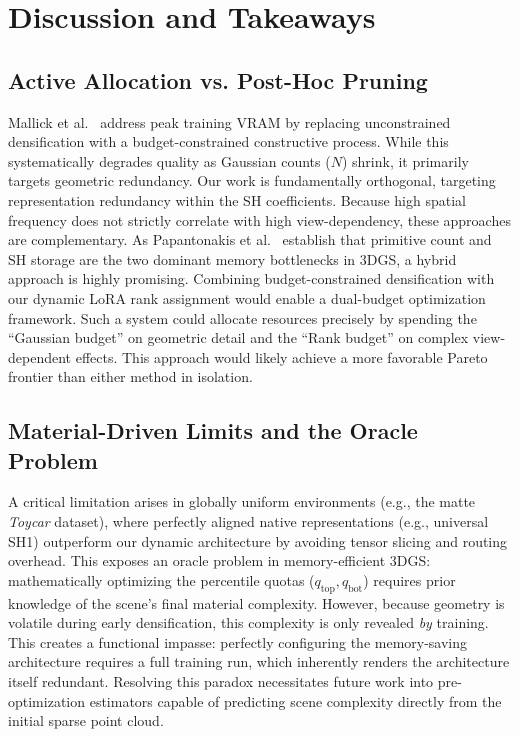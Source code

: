 \documentclass[sigconf]{acmart}
\begin{document}
\section{Discussion and Takeaways}
\label{sec:discussion}
\subsection{Active Allocation vs. Post-Hoc Pruning}
Mallick et al.~\cite{taming3dgs} address peak training VRAM by replacing 
unconstrained densification with a budget-constrained constructive process. 
While this systematically degrades quality as Gaussian counts ($N$) shrink, it 
primarily targets geometric redundancy. Our work is fundamentally orthogonal, 
targeting representation redundancy within the SH coefficients. Because high 
spatial frequency does not strictly correlate with high view-dependency, these 
approaches are complementary. As Papantonakis et al.~\cite{Papantonakis_2024} 
establish that primitive count and SH storage are the two dominant memory 
bottlenecks in 3DGS, a hybrid approach is highly promising. Combining 
budget-constrained densification with our dynamic LoRA rank assignment would 
enable a dual-budget optimization framework. Such a system could allocate 
resources precisely by spending the ``Gaussian budget'' on geometric detail 
and the ``Rank budget'' on complex view-dependent effects. This approach 
would likely achieve a more favorable Pareto frontier than either method in 
isolation.

\subsection{Material-Driven Limits and the Oracle Problem}
A critical limitation arises in globally uniform environments (e.g., the matte 
\textit{Toycar} dataset), where perfectly aligned native representations (e.g., 
universal SH1) outperform our dynamic architecture by avoiding tensor slicing 
and routing overhead. This exposes an oracle problem in memory-efficient 
3DGS: mathematically optimizing the percentile quotas ($q_{\text{top}}, 
q_{\text{bot}}$) requires prior knowledge of the scene's final material 
complexity. However, because geometry is volatile during early densification, 
this complexity is only revealed \emph{by} training. This creates a functional 
impasse: perfectly configuring the memory-saving architecture requires a full 
training run, which inherently renders the architecture itself redundant. 
Resolving this paradox necessitates future work into pre-optimization 
estimators capable of predicting scene complexity directly from the initial 
sparse point cloud.
\end{document}
